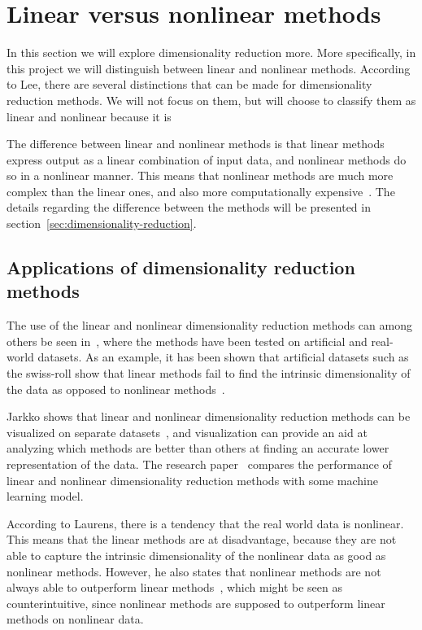 \section{Linear versus nonlinear methods}\label{sec:linear-vs-nonlinear}

In this section we will explore dimensionality reduction more. More specifically, in this project we will distinguish between linear and nonlinear methods. According to Lee, there are several distinctions that can be made for dimensionality reduction methods. We will not focus on them, but will choose to classify them as linear and nonlinear because it is 

The difference between linear and nonlinear methods is that linear methods express output as a linear combination of input data, and nonlinear methods do so in a nonlinear manner. This means that nonlinear methods are much more complex than the linear ones, and also more computationally expensive~\cite{nonlinear-dim-red-chapter-two}. The details regarding the difference between the methods will be presented in section~\ref{sec:dimensionality-reduction}.

\subsection{Applications of dimensionality reduction methods}
The use of the linear and nonlinear dimensionality reduction methods can among others be seen in~\cite{dimensionality-reduction-comparative-review, tennenbaum}, where the methods have been tested on artificial and real-world datasets. As an example, it has been shown that artificial datasets such as the swiss-roll show that linear methods fail to find the intrinsic dimensionality of the data as opposed to nonlinear methods~\cite{tennenbaum}.

Jarkko shows that linear and nonlinear dimensionality reduction methods can be visualized on separate datasets~\cite{dim-red-visual}, and visualization can provide an aid at analyzing which methods are better than others at finding an accurate lower representation of the data. The research paper~\cite{dimensionality-reduction-comparative-review} compares the performance of linear and nonlinear dimensionality reduction methods with some machine learning model.


According to Laurens, there is a tendency that the real world data is nonlinear. This means that the linear methods are at disadvantage, because they are not able to capture the intrinsic dimensionality of the nonlinear data as good as nonlinear methods. However, he also states that nonlinear methods are not always able to outperform linear methods~\cite{dimensionality-reduction-comparative-review}, which might be seen as counterintuitive, since nonlinear methods are supposed to outperform linear methods on nonlinear data.

